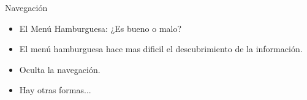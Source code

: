 \documentclass[11pt]{beamer}
\begin{document}
    
    \begin{frame}{Navegación}
        \begin{itemize}
            \item El Menú Hamburguesa: ¿Es bueno o malo?
            \item El menú hamburguesa hace mas dificil el descubrimiento de la información.
            \item Oculta la navegación.
            \item Hay otras formas...
            
           \begin{figure}[!tbp]
                \centering
                \hfill
            \caption{}
        \end{figure}
        \end{itemize}
    \end{frame}
    
    
\end{document}
